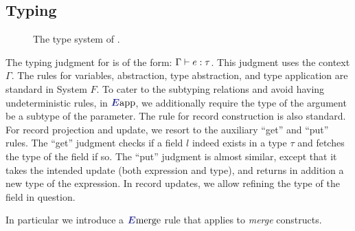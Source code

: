 
\subsection{Typing}

\begin{figure*}

\begin{mathpar}



\end{mathpar}
\begin{mathpar}



\end{mathpar}
\caption{The type system of \name.}
\end{figure*}

The typing judgment for \name is of the form: $ \Gamma \turns e : \tau $. This
judgment uses the context $ \Gamma $. The rules for variables, abstraction, type
abstraction, and type application are standard in System $ F $. To cater to the
subtyping relations and avoid having undeterministic rules, in $ \rulelabeleapp $,
we additionally require the type of the argument be a subtype of the parameter.
The rule for record construction is also standard. For record projection and
update, we resort to the auxiliary ``get'' and ``put'' rules. The ``get''
judgment checks if a field $ l $ indeed exists in a type $ \tau $ and fetches the
type of the field if so. The ``put'' judgment is almost similar, except that it
takes the intended update (both expression and type), and returns in addition a
new type of the expression. In record updates, we allow refining the type of the
field in question.


In particular we introduce a
$ \rulelabelemerge $ rule that applies to \emph{merge}
constructs.


